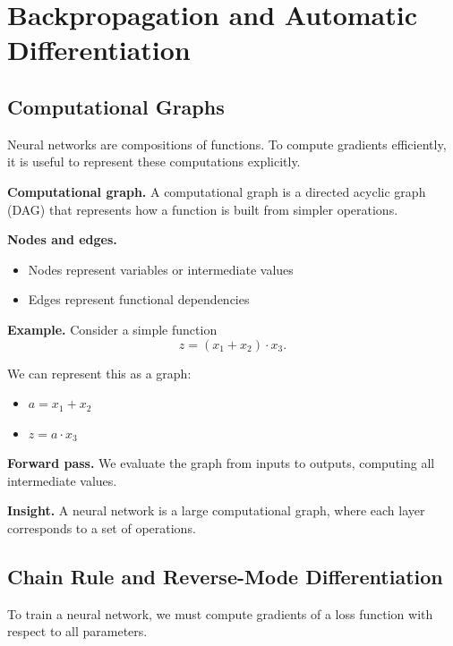 \chapter{Backpropagation and Automatic Differentiation}

\section{Computational Graphs}

Neural networks are compositions of functions. To compute gradients efficiently, it is useful to represent these computations explicitly.

\medskip

\noindent
\textbf{Computational graph.}  
A computational graph is a directed acyclic graph (DAG) that represents how a function is built from simpler operations.

\medskip

\noindent
\textbf{Nodes and edges.}
\begin{itemize}
    \item Nodes represent variables or intermediate values
    \item Edges represent functional dependencies
\end{itemize}

\medskip

\noindent
\textbf{Example.}  
Consider a simple function
\[
z = (x_1 + x_2) \cdot x_3.
\]

\medskip

\noindent
We can represent this as a graph:
\begin{itemize}
    \item $a = x_1 + x_2$
    \item $z = a \cdot x_3$
\end{itemize}

\medskip

\noindent
\textbf{Forward pass.}  
We evaluate the graph from inputs to outputs, computing all intermediate values.

\medskip

\noindent
\textbf{Insight.}  
A neural network is a large computational graph, where each layer corresponds to a set of operations.

\section{Chain Rule and Reverse-Mode Differentiation}

To train a neural network, we must compute gradients of a loss function with respect to all parameters.

